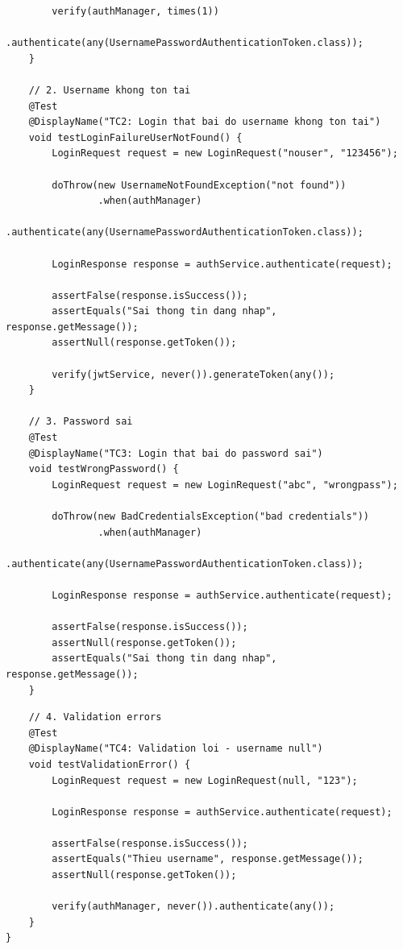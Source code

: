 \documentclass[a4paper,12pt]{article}
\begin{document}
\begin{tcolorbox}[breakable, colback=green!5,colframe=black!50,title=AuthServiceTest.java]
\begin{lstlisting}
        verify(authManager, times(1))
                .authenticate(any(UsernamePasswordAuthenticationToken.class));
    }

    // 2. Username khong ton tai
    @Test
    @DisplayName("TC2: Login that bai do username khong ton tai")
    void testLoginFailureUserNotFound() {
        LoginRequest request = new LoginRequest("nouser", "123456");

        doThrow(new UsernameNotFoundException("not found"))
                .when(authManager)
                .authenticate(any(UsernamePasswordAuthenticationToken.class));

        LoginResponse response = authService.authenticate(request);

        assertFalse(response.isSuccess());
        assertEquals("Sai thong tin dang nhap", response.getMessage());
        assertNull(response.getToken());

        verify(jwtService, never()).generateToken(any());
    }

    // 3. Password sai
    @Test
    @DisplayName("TC3: Login that bai do password sai")
    void testWrongPassword() {
        LoginRequest request = new LoginRequest("abc", "wrongpass");

        doThrow(new BadCredentialsException("bad credentials"))
                .when(authManager)
                .authenticate(any(UsernamePasswordAuthenticationToken.class));

        LoginResponse response = authService.authenticate(request);

        assertFalse(response.isSuccess());
        assertNull(response.getToken());
        assertEquals("Sai thong tin dang nhap", response.getMessage());
    }
\end{lstlisting}
\end{tcolorbox}
\begin{tcolorbox}[breakable, colback=green!5,colframe=black!50,title=AuthServiceTest.java]
\begin{lstlisting}
    // 4. Validation errors
    @Test
    @DisplayName("TC4: Validation loi - username null")
    void testValidationError() {
        LoginRequest request = new LoginRequest(null, "123");

        LoginResponse response = authService.authenticate(request);

        assertFalse(response.isSuccess());
        assertEquals("Thieu username", response.getMessage());
        assertNull(response.getToken());

        verify(authManager, never()).authenticate(any());
    }
}
\end{lstlisting}
\end{tcolorbox}
\end{document}
